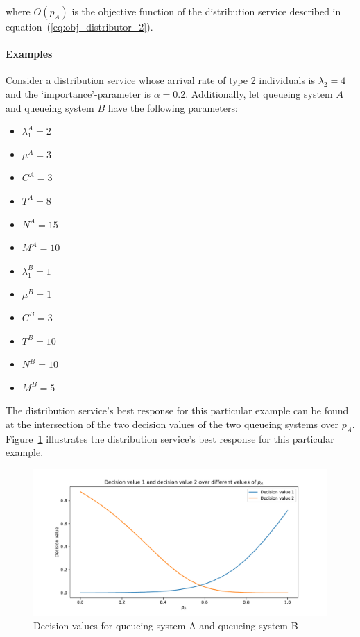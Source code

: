 where \(O(p_A)\) is the objective function of the distribution service described
in equation~(\ref{eq:obj_distributor_2}).

\paragraph{Examples}\label{sec:brent_method_example}
Consider a distribution service whose arrival rate of type 2 individuals is
\(\lambda_2 = 4\) and the `importance'-parameter is \(\alpha = 0.2\).
Additionally, let queueing system \(A\) and queueing system \(B\) have the
following parameters:

\begin{multicols}{2}
    \begin{itemize}
        \item \(\lambda_1^A = 2\)
        \item \(\mu^A = 3\)
        \item \(C^A = 3\)
        \item \(T^A = 8\)
        \item \(N^A = 15\)
        \item \(M^A = 10\)
        \item \(\lambda_1^B = 1\)
        \item \(\mu^B = 1\)
        \item \(C^B = 3\)
        \item \(T^B = 10\)
        \item \(N^B = 10\)
        \item \(M^B = 5\)
    \end{itemize}
\end{multicols}

The distribution service's best response for this particular example can be
found at the intersection of the two decision values of the two queueing
systems over \(p_A\).
Figure~\ref{fig:brent_method_example} illustrates the distribution service's
best response for this particular example.

\begin{figure}[H]
    \centering
    \includegraphics[width=\textwidth]{chapters/04_game_theoretic_model/img/brents_method/brent_method_example.pdf}
    \caption{Decision values for queueing system A and queueing system B}
    \label{fig:brent_method_example}
\end{figure}

